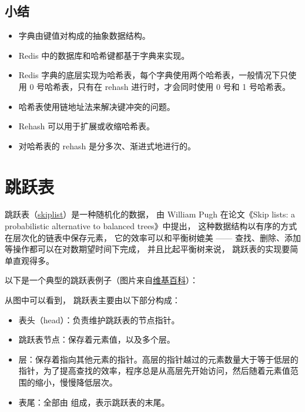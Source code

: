 \documentclass[a4paper,11pt,english]{sphinxmanual}
\begin{document}
\subsection{小结}
\label{internal-datastruct/dict:id24}\begin{itemize}
\item {} 
字典由键值对构成的抽象数据结构。

\item {} 
Redis 中的数据库和哈希键都基于字典来实现。

\item {} 
Redis 字典的底层实现为哈希表，每个字典使用两个哈希表，一般情况下只使用 0 号哈希表，只有在 rehash 进行时，才会同时使用 0 号和 1 号哈希表。

\item {} 
哈希表使用链地址法来解决键冲突的问题。

\item {} 
Rehash 可以用于扩展或收缩哈希表。

\item {} 
对哈希表的 rehash 是分多次、渐进式地进行的。

\end{itemize}


\section{跳跃表}
\label{internal-datastruct/skiplist::doc}\label{internal-datastruct/skiplist:id1}
跳跃表（\href{http://en.wikipedia.org/wiki/Skip\_list}{skiplist}）是一种随机化的数据，
由 William Pugh 在论文《Skip lists: a probabilistic alternative to balanced trees》中提出，
这种数据结构以有序的方式在层次化的链表中保存元素，
它的效率可以和平衡树媲美 ——
查找、删除、添加等操作都可以在对数期望时间下完成，
并且比起平衡树来说，
跳跃表的实现要简单直观得多。

以下是一个典型的跳跃表例子（图片来自\href{http://en.wikipedia.org/wiki/File:Skip\_list.svg}{维基百科}）：


从图中可以看到，
跳跃表主要由以下部分构成：
\begin{itemize}
\item {} 
表头（head）：负责维护跳跃表的节点指针。

\item {} 
跳跃表节点：保存着元素值，以及多个层。

\item {} 
层：保存着指向其他元素的指针。高层的指针越过的元素数量大于等于低层的指针，为了提高查找的效率，程序总是从高层先开始访问，然后随着元素值范围的缩小，慢慢降低层次。

\item {} 
表尾：全部由  组成，表示跳跃表的末尾。

\end{itemize}
\end{document}
